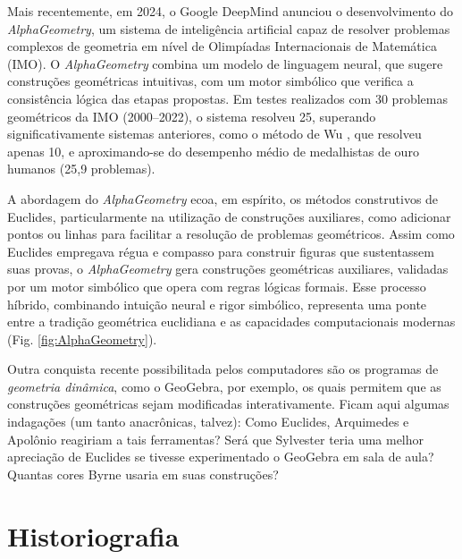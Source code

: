 \documentclass{hipatia}
\begin{document}
Mais recentemente, em 2024, o Google DeepMind anunciou o
desenvolvimento do \emph{AlphaGeometry}\cite{trinh2024},
 um sistema de inteligência
artificial capaz de resolver problemas complexos de
geometria em nível de Olimpíadas Internacionais de
Matemática (IMO). O \emph{AlphaGeometry} combina um modelo de
linguagem neural, que sugere construções geométricas
intuitivas, com um motor simbólico que verifica a
consistência lógica das etapas propostas. Em testes
realizados com 30 problemas geométricos da IMO (2000--2022),
o sistema resolveu 25, superando significativamente sistemas
anteriores, como o método de Wu \cite{chou1988},
que resolveu apenas 10, e aproximando-se do desempenho
médio de medalhistas de ouro humanos (25,9 problemas).

A abordagem do \emph{AlphaGeometry} ecoa, em espírito, os métodos
construtivos de Euclides, particularmente na utilização de
construções auxiliares, como adicionar pontos ou linhas para
facilitar a resolução de problemas geométricos. Assim como
Euclides empregava régua e compasso para construir figuras
que sustentassem suas provas, o \emph{AlphaGeometry} gera
construções geométricas auxiliares, validadas por um motor
simbólico que opera com regras lógicas formais. Esse
processo híbrido, combinando intuição neural e rigor
simbólico, representa uma ponte entre a tradição geométrica
euclidiana e as capacidades computacionais modernas
(Fig. \ref{fig:AlphaGeometry}).

Outra conquista recente possibilitada pelos
computadores são os programas de \emph{geometria
dinâmica}, como o GeoGebra, por exemplo, 
os quais permitem que as construções geométricas
sejam modificadas interativamente. Ficam aqui 
algumas indagações (um tanto anacrônicas, talvez):
Como Euclides, Arquimedes e Apolônio reagiriam
a tais ferramentas? Será que Sylvester 
teria uma melhor apreciação de Euclides se
tivesse experimentado o GeoGebra em sala de aula?
Quantas cores Byrne usaria em suas construções?


\section{Historiografia}
\end{document}
